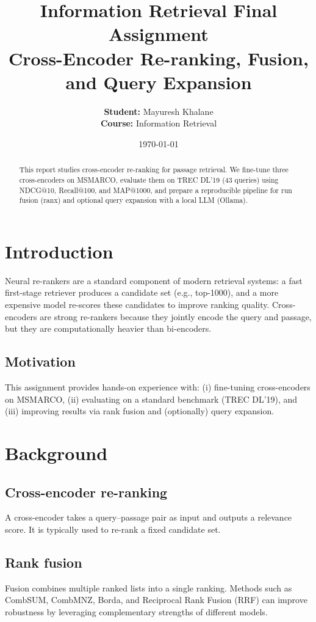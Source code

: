 \documentclass[11pt]{article}
\title{Information Retrieval Final Assignment\\Cross-Encoder Re-ranking, Fusion, and Query Expansion}
\author{\textbf{Student:} Mayuresh Khalane \\\textbf{Course:} Information Retrieval}
\date{\today}
\begin{document}
\maketitle

\begin{abstract}
This report studies cross-encoder re-ranking for passage retrieval. We fine-tune three cross-encoders on MSMARCO, evaluate them on TREC DL'19 (43 queries) using NDCG@10, Recall@100, and MAP@1000, and prepare a reproducible pipeline for run fusion (ranx) and optional query expansion with a local LLM (Ollama).
\end{abstract}

\section{Introduction}
Neural re-rankers are a standard component of modern retrieval systems: a fast first-stage retriever produces a candidate set (e.g., top-1000), and a more expensive model re-scores these candidates to improve ranking quality. Cross-encoders are strong re-rankers because they jointly encode the query and passage, but they are computationally heavier than bi-encoders.

\subsection{Motivation}
This assignment provides hands-on experience with: (i) fine-tuning cross-encoders on MSMARCO, (ii) evaluating on a standard benchmark (TREC DL'19), and (iii) improving results via rank fusion and (optionally) query expansion.

\section{Background}
\subsection{Cross-encoder re-ranking}
A cross-encoder takes a query--passage pair as input and outputs a relevance score. It is typically used to re-rank a fixed candidate set.

\subsection{Rank fusion}
Fusion combines multiple ranked lists into a single ranking. Methods such as CombSUM, CombMNZ, Borda, and Reciprocal Rank Fusion (RRF) can improve robustness by leveraging complementary strengths of different models.
\end{document}
